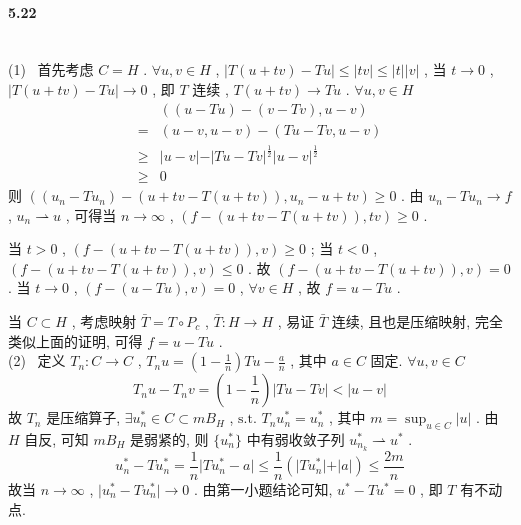 \documentclass[a4paper, UTF8]{ctexart}				%
\numberwithin{equation}{section}				%
\begin{document}
	\paragraph{5.22}\quad\\
	\noindent(1) \, 首先考虑 $C = H$ . $\forall u, v \in H$ , $\vert{T (u + t v) - T u}\vert \le \vert{t v}\vert \le \vert{t}\vert \vert{v}\vert$ , 当 $t \rightarrow 0$ , $\vert{T (u + t v) - T u}\vert \rightarrow 0$ , 即 $T$ 连续 , $T (u + t v) \rightarrow T u$ . $\forall u, v \in H$
	\begin{equation*}
		\begin{split}
				& ({(u - T u) - (v - T v)},{u - v})\\
			=	& ({u - v},{u - v}) - ({T u - T v},{u - v})\\
			\ge	& \vert{u - v}\vert - \vert{T u - T v}\vert^{\frac{1}{2}} \vert{u - v}\vert^{\frac{1}{2}}\\
			\ge	& 0
		\end{split}
	\end{equation*}
	则 $({(u_n - T u_n) - (u + t v - T (u + t v))},{u_n - u + t v}) \ge 0$ . 由 $u_n - T u_n \rightarrow f$ , $u_n \rightharpoonup u$ , 可得当 $n \rightarrow \infty$ , $({f - (u + t v - T (u + t v))},{t v}) \ge 0$ . 
	
	当 $t > 0$ ,  $({f - (u + t v - T (u + t v))},{v}) \ge 0$ ; 当 $t < 0$ , $({f - (u + t v - T (u + t v))},{v}) \le 0$ . 故 $({f - (u + t v - T (u + t v))},{v}) = 0$ . 当 $t \rightarrow 0$ , $({f - (u - T u)},{v}) = 0$ , $\forall v \in H$ , 故 $f = u - T u$ .

	当 $C \subset H$ , 考虑映射 $\bar{T} = T \circ P_c$ , $\bar{T}: H \rightarrow H$ , 易证 $\bar{T}$ 连续, 且也是压缩映射, 完全类似上面的证明, 可得 $f = u -T u$ .\\




	\noindent(2) \, 定义 $T_n: C \rightarrow C$ , $T_n u = (1 - \frac{1}{n}) T u - \frac{a}{n}$ , 其中 $a \in C$ 固定. $\forall u, v \in C$
	\[
		T_n u - T_n v = (1 - \frac{1}{n}) \vert{T u - T v}\vert < \vert{u - v}\vert
	\]
	故 $T_n$ 是压缩算子, $\exists u^*_n \in C \subset m B_H$ , $\text{s.t. } T_n u^*_n = u^*_n$ , 其中 $m = \sup_{u \in C} \vert{u}\vert$ . 由 $H$ 自反, 可知 $m B_H$ 是弱紧的, 则 $\{u^*_n\}$ 中有弱收敛子列 $u^*_{n_k} \rightharpoonup u^*$ . 
	\[
		u^*_n - T u^*_n = \frac{1}{n} \vert{T u^*_n - a}\vert \le \frac{1}{n} (\vert{T u^*_n}\vert + \vert{a}\vert) \le \frac{2 m}{n}
	\]
	故当 $n \rightarrow \infty$ , $\vert{u^*_n - T u^*_n}\vert \rightarrow 0$ . 由第一小题结论可知, $u^* - T u^* = 0$ , 即 $T$ 有不动点.
\end{document}
